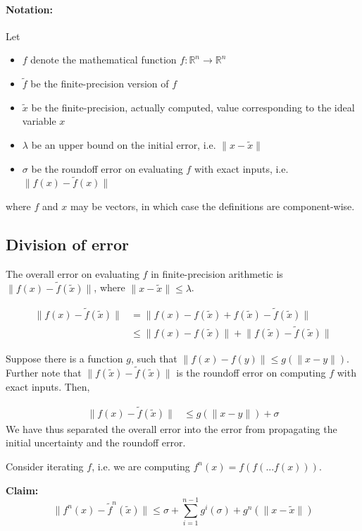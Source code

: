 \documentclass[10pt]{article}
\newcommand{\lv}{\lVert}
\newcommand{\rv}{\rVert}
\newcommand{\tl}{\tilde}
\begin{document}
\paragraph{Notation:} Let
\begin{itemize}
\item $f$ denote the mathematical function $f: \mathbb{R}^n \to \mathbb{R}^n$
\item $\tilde{f}$ be the finite-precision version of $f$
\item $\tilde{x}$ be the finite-precision, actually computed, value corresponding to the
ideal variable $x$
\item $\lambda$ be an upper bound on the initial error, i.e. $\lv x - \tilde{x} \rv$
\item $\sigma$ be the roundoff error on evaluating $f$ with exact inputs, i.e.
  $\lv f(x) - \tilde{f}(x) \rv$
\end{itemize}
where $f$ and $x$ may be vectors, in which case the definitions are component-wise.

\subsection{Division of error}
The overall error on evaluating $f$ in finite-precision arithmetic is
  $\lv f(x) - \tilde{f}(\tilde{x}) \rv$, where $\lv x - \tilde{x} \rv \le \lambda$.

\begin{align}
\lv f(x) - \tilde{f}(\tilde{x}) \rv &=
 \lv f(x) - f(\tilde{x}) + f(\tilde{x}) - \tilde{f}(\tilde{x}) \rv \\
 &\le \lv f(x) - f(\tilde{x}) \rv + \lv f(\tilde{x}) - \tilde{f}(\tilde{x}) \rv
\end{align}

Suppose there is a function $g$, such that $\lv f(x) - f(y) \rv \le g(\lv x - y \rv)$.
Further note that $\lv f(\tilde{x}) - \tilde{f}(\tilde{x}) \rv$ is the roundoff error on
computing $f$ with exact inputs. Then,

\begin{align}
\label{errorLoopBody}
\lv f(x) - \tilde{f}(\tilde{x}) \rv &\le g(\lv x - y \rv) + \sigma
\end{align}
We have thus separated the overall error into the error from propagating
the initial uncertainty and the roundoff error.

Consider iterating $f$, i.e. we are computing $f^n(x) = f(f(...f(x)))$.

{\bf Claim: }
\begin{equation}
\lv f^n(x) - \tl{f}^n(\tl{x})\rv \le \sigma + \sum^{n - 1}_{i = 1} g^i(\sigma) + g^n(\lv x - \tl{x} \rv)
\end{equation}
\end{document}
